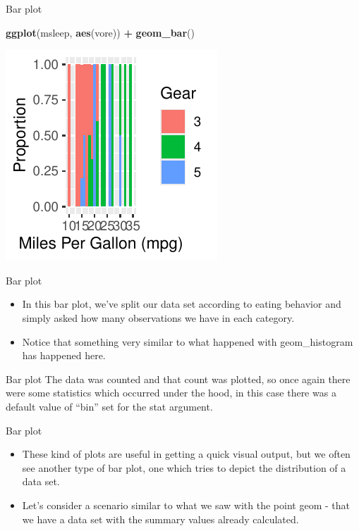 \documentclass[
  ignorenonframetext,
]{beamer}
\newenvironment{Shaded}{\begin{snugshade}}{\end{snugshade}}
\newcommand{\FunctionTok}[1]{\textcolor[rgb]{0.13,0.29,0.53}{\textbf{#1}}}
\newcommand{\NormalTok}[1]{#1}
\newcommand{\SpecialCharTok}[1]{\textcolor[rgb]{0.81,0.36,0.00}{\textbf{#1}}}
\begin{document}
\begin{frame}[fragile]{Bar plot}
\label{bar-plot}
\begin{Shaded}
\begin{Highlighting}[]
\FunctionTok{ggplot}\NormalTok{(msleep, }\FunctionTok{aes}\NormalTok{(vore)) }\SpecialCharTok{+} \FunctionTok{geom\_bar}\NormalTok{()}
\end{Highlighting}
\end{Shaded}

\begin{center}\includegraphics[width=0.5\linewidth]{Figs/unnamed-chunk-43-1} \end{center}
\end{frame}

\begin{frame}{Bar plot}
\label{bar-plot-1}
\begin{itemize}
\item
  In this bar plot, we've split our data set according to eating
  behavior and simply asked how many observations we have in each
  category.
\item
  Notice that something very similar to what happened with
  geom\_histogram has happened here.
\end{itemize}
\end{frame}

\begin{frame}{Bar plot}
\label{bar-plot-2}
The data was counted and that count was plotted, so once again there
were some statistics which occurred under the hood, in this case there
was a default value of ``bin'' set for the stat argument.
\end{frame}

\begin{frame}{Bar plot}
\label{bar-plot-3}
\begin{itemize}
\item
  These kind of plots are useful in getting a quick visual output, but
  we often see another type of bar plot, one which tries to depict the
  distribution of a data set.
\item
  Let's consider a scenario similar to what we saw with the point geom -
  that we have a data set with the summary values already calculated.
\end{itemize}
\end{frame}
\end{document}
